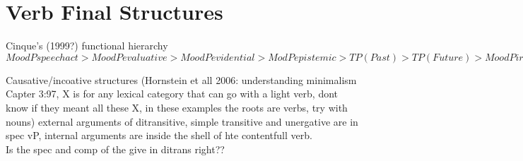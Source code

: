 \documentclass{article}
\begin{document}
\section{Verb Final Structures}

\begin{example} Cinque’s (1999?) functional hierarchy \\
$MoodPspeech act > MoodPevaluative > MoodPevidential > ModPepistemic > TP(Past) > TP(Future) > MoodPirrealis > ModPalethic > AspPhabitual > AspPrepetitive(I) > AspPfrequentative(I) > ModPvolitional > AspPcelerative(I) > TP(Anterior) > AspPterminative > AspPcontinuative > AspPretrospective > AspPproximative > AspPdurative > AspPgeneric/progressive > AspPprospective > ModPobligation > ModPpermission/ability > AspPCompletive > VoiceP > AspPcelerative(II) > AspPrepetitive(II) > AspPfrequentative(II)$
\end{example}

\begin{example}Causative/incoative structures (Hornstein et all 2006: understanding minimalism Capter 3:97, X is for any lexical category that can go with a light verb, dont know if they meant all these X, in these examples the roots are verbs, try with nouns) external arguments of ditransitive, simple transitive and unergative are in spec vP, internal arguments are inside the shell of hte contentfull verb.\\
Is the spec and comp of the give in ditrans right??\\
\end{example} 	
\end{document}
